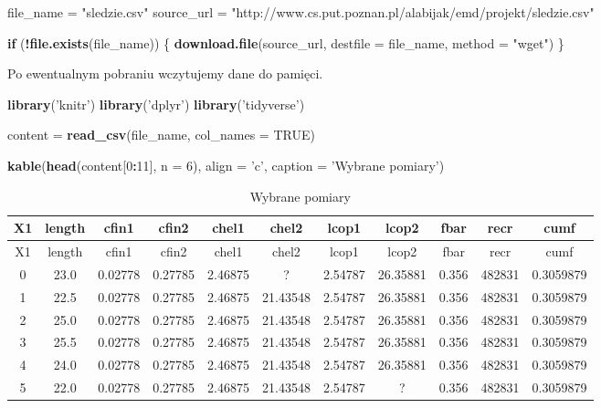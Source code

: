 \documentclass[]{article}
\newenvironment{Shaded}{\begin{snugshade}}{\end{snugshade}}
\newcommand{\ControlFlowTok}[1]{\textcolor[rgb]{0.13,0.29,0.53}{\textbf{#1}}}
\newcommand{\DataTypeTok}[1]{\textcolor[rgb]{0.13,0.29,0.53}{#1}}
\newcommand{\DecValTok}[1]{\textcolor[rgb]{0.00,0.00,0.81}{#1}}
\newcommand{\KeywordTok}[1]{\textcolor[rgb]{0.13,0.29,0.53}{\textbf{#1}}}
\newcommand{\NormalTok}[1]{#1}
\newcommand{\OperatorTok}[1]{\textcolor[rgb]{0.81,0.36,0.00}{\textbf{#1}}}
\newcommand{\OtherTok}[1]{\textcolor[rgb]{0.56,0.35,0.01}{#1}}
\newcommand{\StringTok}[1]{\textcolor[rgb]{0.31,0.60,0.02}{#1}}
\begin{document}
\begin{Shaded}
\begin{Highlighting}[]
\NormalTok{file_name =}\StringTok{ "sledzie.csv"}
\NormalTok{source_url =}\StringTok{ "http://www.cs.put.poznan.pl/alabijak/emd/projekt/sledzie.csv"}

\ControlFlowTok{if}\NormalTok{ (}\OperatorTok{!}\KeywordTok{file.exists}\NormalTok{(file_name)) \{}
  \KeywordTok{download.file}\NormalTok{(source_url, }\DataTypeTok{destfile =}\NormalTok{ file_name, }\DataTypeTok{method =} \StringTok{"wget"}\NormalTok{)}
\NormalTok{\}}
\end{Highlighting}
\end{Shaded}

Po ewentualnym pobraniu wczytujemy dane do pamięci.

\begin{Shaded}
\begin{Highlighting}[]
\KeywordTok{library}\NormalTok{(}\StringTok{'knitr'}\NormalTok{)}
\KeywordTok{library}\NormalTok{(}\StringTok{'dplyr'}\NormalTok{)}
\KeywordTok{library}\NormalTok{(}\StringTok{'tidyverse'}\NormalTok{)}

\NormalTok{content =}\StringTok{ }\KeywordTok{read_csv}\NormalTok{(file_name, }\DataTypeTok{col_names =} \OtherTok{TRUE}\NormalTok{)}

\KeywordTok{kable}\NormalTok{(}\KeywordTok{head}\NormalTok{(content[}\DecValTok{0}\OperatorTok{:}\DecValTok{11}\NormalTok{], }\DataTypeTok{n =} \DecValTok{6}\NormalTok{), }\DataTypeTok{align =} \StringTok{'c'}\NormalTok{, }\DataTypeTok{caption =} \StringTok{'Wybrane pomiary'}\NormalTok{)}
\end{Highlighting}
\end{Shaded}

\begin{longtable}[]{@{}ccccccccccc@{}}
\caption{Wybrane pomiary}\tabularnewline
\toprule
X1 & length & cfin1 & cfin2 & chel1 & chel2 & lcop1 & lcop2 & fbar &
recr & cumf\tabularnewline
\midrule
\endfirsthead
\toprule
X1 & length & cfin1 & cfin2 & chel1 & chel2 & lcop1 & lcop2 & fbar &
recr & cumf\tabularnewline
\midrule
\endhead
0 & 23.0 & 0.02778 & 0.27785 & 2.46875 & ? & 2.54787 & 26.35881 & 0.356
& 482831 & 0.3059879\tabularnewline
1 & 22.5 & 0.02778 & 0.27785 & 2.46875 & 21.43548 & 2.54787 & 26.35881 &
0.356 & 482831 & 0.3059879\tabularnewline
2 & 25.0 & 0.02778 & 0.27785 & 2.46875 & 21.43548 & 2.54787 & 26.35881 &
0.356 & 482831 & 0.3059879\tabularnewline
3 & 25.5 & 0.02778 & 0.27785 & 2.46875 & 21.43548 & 2.54787 & 26.35881 &
0.356 & 482831 & 0.3059879\tabularnewline
4 & 24.0 & 0.02778 & 0.27785 & 2.46875 & 21.43548 & 2.54787 & 26.35881 &
0.356 & 482831 & 0.3059879\tabularnewline
5 & 22.0 & 0.02778 & 0.27785 & 2.46875 & 21.43548 & 2.54787 & ? & 0.356
& 482831 & 0.3059879\tabularnewline
\bottomrule
\end{longtable}
\end{document}
